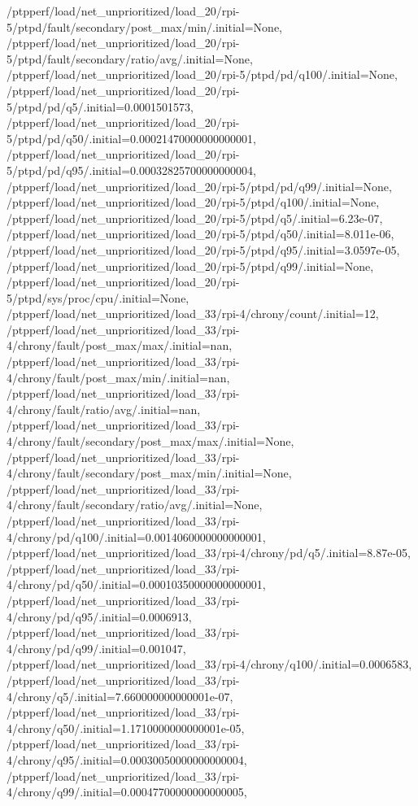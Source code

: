 {    /ptpperf/load/net_unprioritized/load_20/rpi-5/ptpd/fault/secondary/post_max/min/.initial=None,
    /ptpperf/load/net_unprioritized/load_20/rpi-5/ptpd/fault/secondary/ratio/avg/.initial=None,
    /ptpperf/load/net_unprioritized/load_20/rpi-5/ptpd/pd/q100/.initial=None,
    /ptpperf/load/net_unprioritized/load_20/rpi-5/ptpd/pd/q5/.initial=0.0001501573,
    /ptpperf/load/net_unprioritized/load_20/rpi-5/ptpd/pd/q50/.initial=0.00021470000000000001,
    /ptpperf/load/net_unprioritized/load_20/rpi-5/ptpd/pd/q95/.initial=0.00032825700000000004,
    /ptpperf/load/net_unprioritized/load_20/rpi-5/ptpd/pd/q99/.initial=None,
    /ptpperf/load/net_unprioritized/load_20/rpi-5/ptpd/q100/.initial=None,
    /ptpperf/load/net_unprioritized/load_20/rpi-5/ptpd/q5/.initial=6.23e-07,
    /ptpperf/load/net_unprioritized/load_20/rpi-5/ptpd/q50/.initial=8.011e-06,
    /ptpperf/load/net_unprioritized/load_20/rpi-5/ptpd/q95/.initial=3.0597e-05,
    /ptpperf/load/net_unprioritized/load_20/rpi-5/ptpd/q99/.initial=None,
    /ptpperf/load/net_unprioritized/load_20/rpi-5/ptpd/sys/proc/cpu/.initial=None,
    /ptpperf/load/net_unprioritized/load_33/rpi-4/chrony/count/.initial=12,
    /ptpperf/load/net_unprioritized/load_33/rpi-4/chrony/fault/post_max/max/.initial=nan,
    /ptpperf/load/net_unprioritized/load_33/rpi-4/chrony/fault/post_max/min/.initial=nan,
    /ptpperf/load/net_unprioritized/load_33/rpi-4/chrony/fault/ratio/avg/.initial=nan,
    /ptpperf/load/net_unprioritized/load_33/rpi-4/chrony/fault/secondary/post_max/max/.initial=None,
    /ptpperf/load/net_unprioritized/load_33/rpi-4/chrony/fault/secondary/post_max/min/.initial=None,
    /ptpperf/load/net_unprioritized/load_33/rpi-4/chrony/fault/secondary/ratio/avg/.initial=None,
    /ptpperf/load/net_unprioritized/load_33/rpi-4/chrony/pd/q100/.initial=0.0014060000000000001,
    /ptpperf/load/net_unprioritized/load_33/rpi-4/chrony/pd/q5/.initial=8.87e-05,
    /ptpperf/load/net_unprioritized/load_33/rpi-4/chrony/pd/q50/.initial=0.00010350000000000001,
    /ptpperf/load/net_unprioritized/load_33/rpi-4/chrony/pd/q95/.initial=0.0006913,
    /ptpperf/load/net_unprioritized/load_33/rpi-4/chrony/pd/q99/.initial=0.001047,
    /ptpperf/load/net_unprioritized/load_33/rpi-4/chrony/q100/.initial=0.0006583,
    /ptpperf/load/net_unprioritized/load_33/rpi-4/chrony/q5/.initial=7.660000000000001e-07,
    /ptpperf/load/net_unprioritized/load_33/rpi-4/chrony/q50/.initial=1.1710000000000001e-05,
    /ptpperf/load/net_unprioritized/load_33/rpi-4/chrony/q95/.initial=0.00030050000000000004,
    /ptpperf/load/net_unprioritized/load_33/rpi-4/chrony/q99/.initial=0.00047700000000000005,
}
